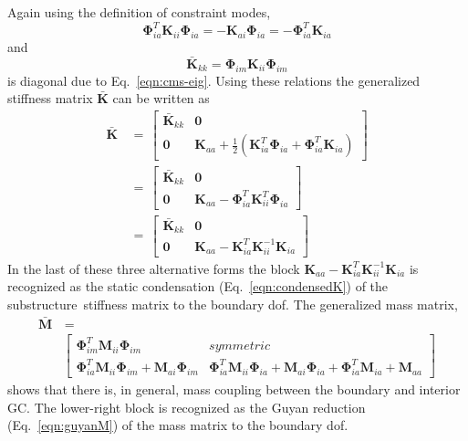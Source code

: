 \documentclass[10pt,openany,twoside]{book}
\numberwithin{equation}{section}   %
\newcommand{\Matrix}[1]{\boldsymbol{#1}}
\newcommand{\Gc}{GC}
\newcommand{\Eqn}[1]{Eq.\ \ref{#1}}
\newcommand{\Ss}{substructure}
\begin{document}
Again using the definition of constraint modes,
\begin{equation}
\Matrix{\Phi}_{ia}^T \Matrix{K}_{ii} \Matrix{\Phi}_{ia} =
                - \Matrix{K}_{ai} \Matrix{\Phi}_{ia} = - \Matrix{\Phi}_{ia}^T \Matrix{K}_{ia}		\nonumber
\end{equation}
and
\begin{equation}
\Matrix{\bar{K}}_{kk} = \Matrix{\Phi}_{im} \Matrix{K}_{ii} \Matrix{\Phi}_{im}	\nonumber
\end{equation}
is diagonal due to \Eqn{eqn:cms-eig}.
Using these relations the generalized stiffness matrix $\Matrix{\bar{K}}$
can be written as
\begin{equation}
\begin{split}
\Matrix{\bar{K}} & \, = \, \left[
\begin{array}{cc}
   \Matrix{\bar{K}}_{kk} & \Matrix{0} \\
   \Matrix{0} & \Matrix{K}_{aa} + \frac{1}{2} \left( \Matrix{K}_{ia}^T \Matrix{\Phi}_{ia} + \Matrix{\Phi}_{ia}^T \Matrix{K}_{ia} \right)
\end{array}
\right]         \\
 & \, = \, \left[
\begin{array}{cc}
   \Matrix{\bar{K}}_{kk} & \Matrix{0} \\
   \Matrix{0} & \Matrix{K}_{aa} - \Matrix{\Phi}_{ia}^T \Matrix{K}_{ii}^T \Matrix{\Phi}_{ia}
\end{array}
\right]         \\
 & \, = \, \left[
\begin{array}{cc}
   \Matrix{\bar{K}}_{kk} & \Matrix{0} \\
   \Matrix{0} & \Matrix{K}_{aa} - \Matrix{K}_{ia}^T \Matrix{K}_{ii}^{-1} \Matrix{K}_{ia}
\end{array}
\right]
\end{split}			\nonumber
\end{equation}
In the last of these three alternative forms the block
$\Matrix{K}_{aa} - \Matrix{K}_{ia}^T \Matrix{K}_{ii}^{-1} \Matrix{K}_{ia}$
is recognized as the static condensation (\Eqn{eqn:condensedK}) of
the \Ss\ stiffness matrix to the boundary dof. The generalized
mass matrix,
\begin{equation}
\begin{split}
\Matrix{\bar{M}} & \, = \\
 &  \left[
\begin{array}{cc}
   \Matrix{\Phi}_{im}^T \Matrix{M}_{ii} \Matrix{\Phi}_{im} & symmetric \\
   \Matrix{\Phi}_{ia}^T \Matrix{M}_{ii} \Matrix{\Phi}_{im} + \Matrix{M}_{ai} \Matrix{\Phi}_{im} &
                        \Matrix{\Phi}_{ia}^T \Matrix{M}_{ii} \Matrix{\Phi}_{ia} +
                        \Matrix{M}_{ai} \Matrix{\Phi}_{ia} + \Matrix{\Phi}_{ia}^T \Matrix{M}_{ia}
                                + \Matrix{M}_{aa}
\end{array}
\right]
\end{split}		\nonumber
\end{equation}
shows that there is, in general, mass coupling between the
boundary and interior \Gc.
The lower-right block is recognized as the Guyan reduction
(\Eqn{eqn:guyanM})
of the mass matrix to the boundary dof.
\end{document}

